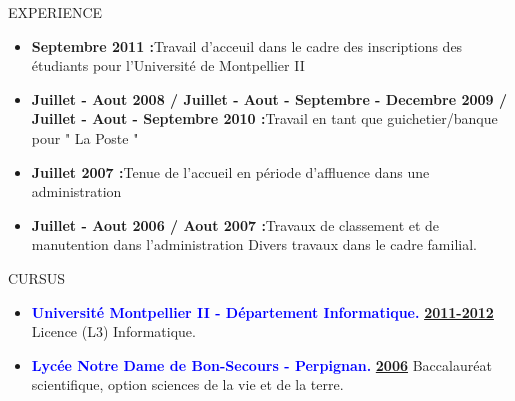 \documentclass[a4paper]{article}
\begin{document}
\textcolor[gray]{0.6}{{\Large  EXPERIENCE}}




\noindent 
\newline %
\begin{itemize}




\item \textbf{Septembre 2011 :}\hspace*{0.5cm}Travail d'acceuil dans le cadre des inscriptions des étudiants pour l'Université de Montpellier II
\item \textbf{Juillet - Aout  2008 / Juillet - Aout - Septembre - Decembre  2009 / Juillet - Aout - Septembre  2010 :}\hspace*{0.5cm}Travail en tant que guichetier/banque pour " La Poste "
\item \textbf{Juillet  2007 :}\hspace*{0.5cm}Tenue de l’accueil en période d’affluence dans une administration
\item \textbf{Juillet - Aout  2006 / Aout  2007 :}\hspace*{0.5cm}Travaux de classement et de manutention dans l’administration
\newline
Divers travaux dans le cadre familial.
\newline 
\newline 




\end{itemize}








\textcolor[gray]{0.6}{{\Large  CURSUS}}




\noindent 
\newline
\begin{itemize}
\item \textcolor{blue}{\textbf{Université Montpellier II - Département Informatique.}}
\newline
\underline{\textbf{2011-2012}}
\newline
\newline
Licence (L3) Informatique.
\newline
\item \textcolor{blue}{\textbf{Lycée Notre Dame de Bon-Secours - Perpignan.}}
\newline
\underline{\textbf{2006}}
\newline
\newline
Baccalauréat scientifique, option sciences de la vie et de la terre.
\newline
\newline
\end{itemize}
\end{document}
